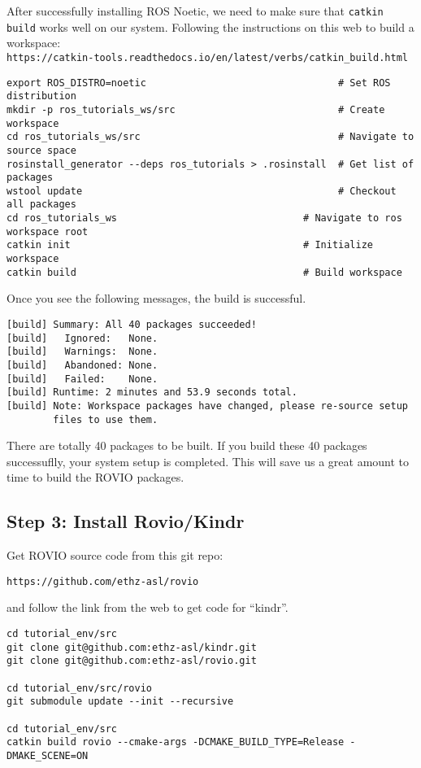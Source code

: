 \documentclass[11pt, oneside]{article}   	%
\begin{document}
After successfully installing ROS Noetic, we need to make sure that
\verb+catkin build+ works well on our system. Following the
instructions on this web to build a workspace:\\
\verb+https://catkin-tools.readthedocs.io/en/latest/verbs/catkin_build.html+


\begin{verbatim}
export ROS_DISTRO=noetic                                 # Set ROS distribution
mkdir -p ros_tutorials_ws/src                            # Create workspace
cd ros_tutorials_ws/src                                  # Navigate to source space
rosinstall_generator --deps ros_tutorials > .rosinstall  # Get list of packages
wstool update                                            # Checkout all packages
cd ros_tutorials_ws                                # Navigate to ros workspace root
catkin init                                        # Initialize workspace
catkin build                                       # Build workspace
\end{verbatim}

Once you see the following messages, the build is successful.
\begin{verbatim}
[build] Summary: All 40 packages succeeded!
[build]   Ignored:   None.
[build]   Warnings:  None.
[build]   Abandoned: None.
[build]   Failed:    None.
[build] Runtime: 2 minutes and 53.9 seconds total.
[build] Note: Workspace packages have changed, please re-source setup
        files to use them.
\end{verbatim}

There are totally 40 packages to be built. If you build these 40
packages successuflly, your system setup is completed. This will save
us a great amount to time to build the ROVIO packages.

\subsection{Step 3: Install Rovio/Kindr}
Get ROVIO source code from this git repo:\\
\begin{verbatim}
https://github.com/ethz-asl/rovio
\end{verbatim}
and follow the link from the web to get code for ``kindr''.

\begin{verbatim}
cd tutorial_env/src
git clone git@github.com:ethz-asl/kindr.git
git clone git@github.com:ethz-asl/rovio.git

cd tutorial_env/src/rovio
git submodule update --init --recursive

cd tutorial_env/src
catkin build rovio --cmake-args -DCMAKE_BUILD_TYPE=Release -DMAKE_SCENE=ON
\end{verbatim}
\end{document}
